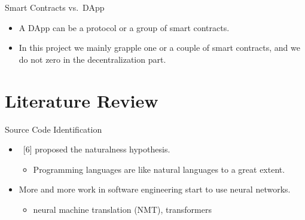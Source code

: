 \documentclass[xcolor=svgnames]{beamer}
\begin{document}
\begin{frame}[t]{Smart Contracts vs.\ DApp}
\begin{itemize}
\begin{onlyenv}
\begin{figure}
\end{figure}
\end{onlyenv}

\item<3-> A DApp can be a protocol or a group of smart contracts.
\item<4-> In this project we mainly grapple one or a couple of smart contracts, and we do not zero in the decentralization part.
\end{itemize}

\end{frame}



\section{Literature Review}
\begin{frame}{Source Code Identification}

\begin{itemize}
\item {}~[6] proposed the naturalness hypothesis.
\begin{itemize}
\item Programming languages are like natural languages to a great extent.
\end{itemize}

\item  More and more work in software engineering start to use neural networks.
\begin{itemize}
\item neural machine translation (NMT), transformers
\end{itemize}
\end{itemize}
\end{frame}
\end{document}
